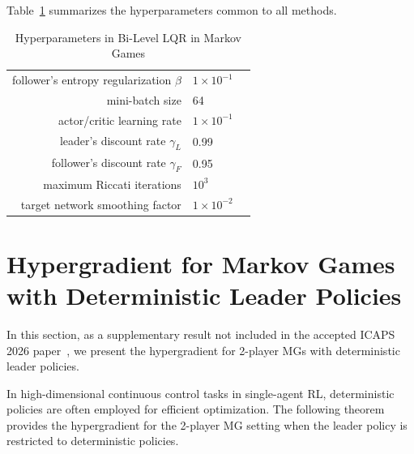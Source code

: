 \documentclass[letterpaper]{article} %
\begin{document}
Table~\ref{tab:params_lqr_mg} summarizes the hyperparameters common to all methods.

\begin{table}[t]
    \centering
    \begin{tabular}{rll}\toprule
        follower's entropy regularization $\beta$ & $1\times10^{-1}$\\
        mini-batch size & 64\\
        actor/critic learning rate & $1\times10^{-1}$\\
        leader’s discount rate $\gamma_L$ & 0.99\\
        follower’s discount rate $\gamma_F$ & 0.95\\
        maximum Riccati iterations & $10^3$\\
        target network smoothing factor & $1\times10^{-2}$\\ \bottomrule
    \end{tabular}
    \caption{Hyperparameters in Bi-Level LQR in Markov Games}
    \label{tab:params_lqr_mg}
\end{table}

\section{Hypergradient for Markov Games with Deterministic Leader Policies}

In this section, as a supplementary result not included in the accepted ICAPS 2026 paper~\citep{kudo2026-icaps}, we present the hypergradient for 2-player MGs with deterministic leader policies.

In high-dimensional continuous control tasks in single-agent RL, deterministic policies are often employed for efficient optimization.
The following theorem provides the hypergradient for the 2-player MG setting when the leader policy is restricted to deterministic policies.
\end{document}
